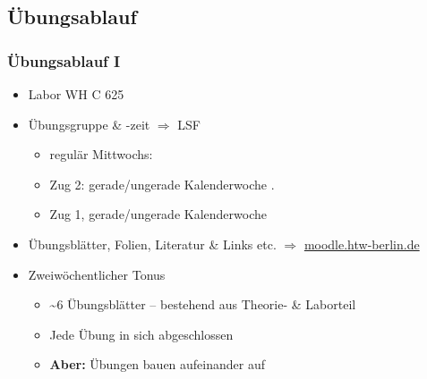 \documentclass[xcolor=dvipsnames,aspectratio=169]{beamer}
\begin{document}
\subsection{Übungsablauf}
\begin{frame}
	\frametitle{Übungsablauf I}
	\begin{itemize}
		\item Labor WH C 625
		\item Übungsgruppe \& -zeit $\Rightarrow$ LSF
		\begin{itemize}
			\item regulär Mittwochs: 
			\item Zug 2: gerade/ungerade Kalenderwoche .
			\item Zug 1, gerade/ungerade Kalenderwoche 
		\end{itemize}
		\item Übungsblätter, Folien, Literatur \& Links etc. $\Rightarrow$ \url{moodle.htw-berlin.de}
		\item Zweiwöchentlicher Tonus 
		\begin{itemize}
			\item \textasciitilde 6 Übungsblätter -- bestehend aus Theorie- \& Laborteil
			\item Jede Übung in sich abgeschlossen
			\item \textbf{Aber:} Übungen bauen aufeinander auf
		\end{itemize}
	\end{itemize}
\end{frame}
\end{document}

